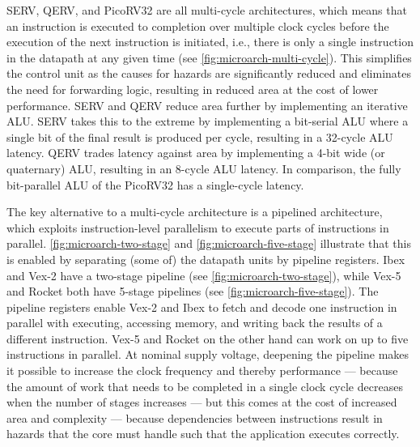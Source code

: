 SERV, QERV, and PicoRV32 are all multi-cycle architectures, which means that an instruction is executed to completion over multiple clock cycles before the execution of the next instruction is initiated, i.e., there is only a single instruction in the datapath at any given time (see \autoref{fig:microarch-multi-cycle}).
This simplifies the control unit as the causes for hazards are significantly reduced and eliminates the need for forwarding logic, resulting in reduced area at the cost of lower performance.
SERV and QERV reduce area further by implementing an iterative ALU.
SERV takes this to the extreme by implementing a bit-serial ALU where a single bit of the final result is produced per cycle, resulting in a 32-cycle ALU latency. 
QERV trades latency against area by implementing a 4-bit wide (or quaternary) ALU, resulting in an 8-cycle ALU latency.
In comparison, the fully bit-parallel ALU of the PicoRV32 has a single-cycle latency.

The key alternative to a multi-cycle architecture is a pipelined architecture, which exploits instruction-level parallelism to execute parts of instructions in parallel. \autoref{fig:microarch-two-stage} and \ref{fig:microarch-five-stage} illustrate that this is enabled by separating (some of) the datapath units by pipeline registers.
Ibex and Vex-2 have a two-stage pipeline (see \autoref{fig:microarch-two-stage}), while Vex-5 and Rocket both have 5-stage pipelines (see \autoref{fig:microarch-five-stage}).
The pipeline registers enable Vex-2 and Ibex to fetch and decode one instruction in parallel with executing, accessing memory, and writing back the results of a different instruction. Vex-5 and Rocket on the other hand can work on up to five instructions in parallel.
At nominal supply voltage, deepening the pipeline makes it possible to increase the clock frequency and thereby performance --- because the amount of work that needs to be completed in a single clock cycle decreases when the number of stages increases --- but this comes at the cost of increased area and complexity --- because dependencies between instructions result in hazards that the core must handle such that the application executes correctly.
